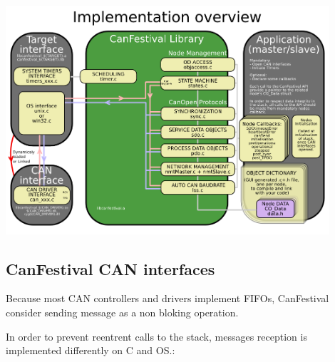 \documentclass[a4paper,12pt]{book}
\begin{document}
 \begin{center}
   \includegraphics[width=12cm]{Pictures/10000201000003F9000002CF880931E7.png}
\end{center}

\bigskip

\subsection{CanFestival CAN interfaces}
Because most CAN controllers and drivers implement FIFOs, CanFestival
consider sending message as a non bloking operation.

In order to prevent reentrent calls to the stack, messages reception is
implemented differently on {\textmu}C and OS.:
\end{document}
